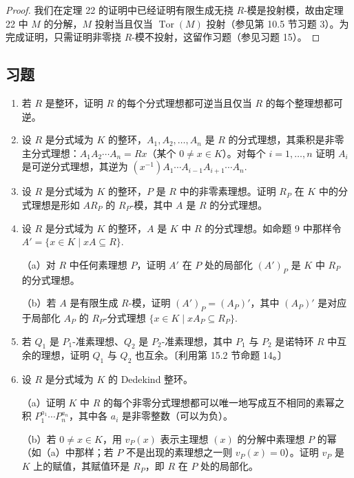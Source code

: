 \begin{proof}
我们在定理 22 的证明中已经证明有限生成无挠 \(R\)-模是投射模，故由定理 22 中 \(M\) 的分解，\(M\) 投射当且仅当 \(\operatorname{Tor}(M)\) 投射（参见第 10.5 节习题 3）。为完成证明，只需证明非零挠 \(R\)-模不投射，这留作习题（参见习题 15）。
\end{proof}

\subsection*{习题}

\begin{enumerate}
\item 若 \(R\) 是整环，证明 \(R\) 的每个分式理想都可逆当且仅当 \(R\) 的每个整理想都可逆。

\item 设 \(R\) 是分式域为 \(K\) 的整环，\(A_1, A_2, \ldots, A_n\) 是 \(R\) 的分式理想，其乘积是非零主分式理想：\(A_1A_2\cdots A_n = Rx\)（某个 \(0 \neq x \in K\)）。对每个 \(i = 1, \ldots, n\) 证明 \(A_i\) 是可逆分式理想，其逆为 \((x^{-1})A_1\cdots A_{i-1}A_{i+1}\cdots A_n\).

\item 设 \(R\) 是分式域为 \(K\) 的整环，\(P\) 是 \(R\) 中的非零素理想。证明 \(R_P\) 在 \(K\) 中的分式理想是形如 \(AR_P\) 的 \(R_P\)-模，其中 \(A\) 是 \(R\) 的分式理想。

\item 设 \(R\) 是分式域为 \(K\) 的整环，\(A\) 是 \(K\) 中 \(R\) 的分式理想。如命题 9 中那样令 \(A' = \{x \in K \mid xA \subseteq R\}\).

（a）对 \(R\) 中任何素理想 \(P\)，证明 \(A'\) 在 \(P\) 处的局部化 \((A')_P\) 是 \(K\) 中 \(R_P\) 的分式理想。

（b）若 \(A\) 是有限生成 \(R\)-模，证明 \((A')_P = (A_P)'\)，其中 \((A_P)'\) 是对应于局部化 \(A_P\) 的 \(R_P\)-分式理想 \(\{x \in K \mid xA_P \subseteq R_P\}\).

\item 若 \(Q_1\) 是 \(P_1\)-准素理想、\(Q_2\) 是 \(P_2\)-准素理想，其中 \(P_1\) 与 \(P_2\) 是诺特环 \(R\) 中互余的理想，证明 \(Q_1\) 与 \(Q_2\) 也互余。〔利用第 15.2 节命题 14。〕

\item 设 \(R\) 是分式域为 \(K\) 的 Dedekind 整环。

（a）证明 \(K\) 中 \(R\) 的每个非零分式理想都可以唯一地写成互不相同的素幂之积 \(P_1^{a_1}\cdots P_n^{a_n}\)，其中各 \(a_i\) 是非零整数（可以为负）。

（b）若 \(0 \neq x \in K\)，用 \(v_P(x)\) 表示主理想 \((x)\) 的分解中素理想 \(P\) 的幂（如（a）中那样；若 \(P\) 不是出现的素理想之一则 \(v_P(x) = 0\)）。证明 \(v_P\) 是 \(K\) 上的赋值，其赋值环是 \(R_P\)，即 \(R\) 在 \(P\) 处的局部化。


\end{enumerate}
